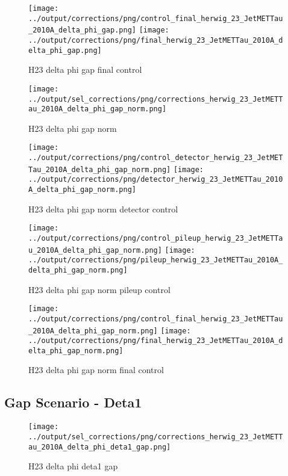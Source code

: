 \documentclass[11pt]{book}
\begin{document}
\begin{figure}[ht]
\centering
\texttt{[image: ../output/corrections/png/control\_final\_herwig\_23\_JetMETTau\_2010A\_delta\_phi\_gap.png]}
\texttt{[image: ../output/corrections/png/final\_herwig\_23\_JetMETTau\_2010A\_delta\_phi\_gap.png]}
\caption{H23 delta phi gap final control}
\label{fig:H23_JetMETTau_2010A_delta_phi_gap_final_control}
\end{figure}


\begin{figure}[ht]
\centering
\texttt{[image: ../output/sel\_corrections/png/corrections\_herwig\_23\_JetMETTau\_2010A\_delta\_phi\_gap\_norm.png]}
\caption{H23 delta phi gap norm}
\label{fig:H23_JetMETTau_2010A_delta_phi_gap_norm}
\end{figure}

\begin{figure}[ht]
\centering
\texttt{[image: ../output/corrections/png/control\_detector\_herwig\_23\_JetMETTau\_2010A\_delta\_phi\_gap\_norm.png]}
\texttt{[image: ../output/corrections/png/detector\_herwig\_23\_JetMETTau\_2010A\_delta\_phi\_gap\_norm.png]}
\caption{H23 delta phi gap norm detector control}
\label{fig:H23_JetMETTau_2010A_delta_phi_gap_norm_detector_control}
\end{figure}

\begin{figure}[ht]
\centering
\texttt{[image: ../output/corrections/png/control\_pileup\_herwig\_23\_JetMETTau\_2010A\_delta\_phi\_gap\_norm.png]}
\texttt{[image: ../output/corrections/png/pileup\_herwig\_23\_JetMETTau\_2010A\_delta\_phi\_gap\_norm.png]}
\caption{H23 delta phi gap norm pileup control}
\label{fig:H23_JetMETTau_2010A_delta_phi_gap_norm_pileup_control}
\end{figure}


\begin{figure}[ht]
\centering
\texttt{[image: ../output/corrections/png/control\_final\_herwig\_23\_JetMETTau\_2010A\_delta\_phi\_gap\_norm.png]}
\texttt{[image: ../output/corrections/png/final\_herwig\_23\_JetMETTau\_2010A\_delta\_phi\_gap\_norm.png]}
\caption{H23 delta phi gap norm final control}
\label{fig:H23_JetMETTau_2010A_delta_phi_gap_norm_final_control}
\end{figure}



\clearpage
\subsection{Gap Scenario - Deta1}
\begin{figure}[ht]
\centering
\texttt{[image: ../output/sel\_corrections/png/corrections\_herwig\_23\_JetMETTau\_2010A\_delta\_phi\_deta1\_gap.png]}
\caption{H23 delta phi deta1 gap}
\label{fig:H23_JetMETTau_2010A_delta_phi_deta1_gap}
\end{figure}
\end{document}
